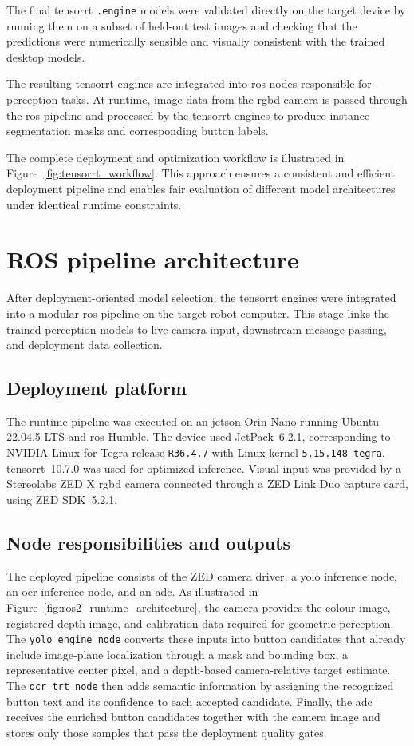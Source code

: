 The final \gls{tensorrt}
\texttt{.engine} models were validated directly on the target device by running
them on a subset of held-out test images and checking that the predictions were
numerically sensible and visually consistent with the trained desktop models.

The resulting \gls{tensorrt} engines are integrated into \gls{ros} nodes responsible for
perception tasks. At runtime, image data from the \gls{rgbd} camera is passed through
the \gls{ros} pipeline and processed by the \gls{tensorrt} engines to produce instance
segmentation masks and corresponding button labels.

The complete deployment and optimization workflow is illustrated in
Figure~\ref{fig:tensorrt_workflow}. This approach ensures a consistent and efficient
deployment pipeline and enables fair evaluation of different model architectures
under identical runtime constraints.

\section{ROS pipeline architecture}

After deployment-oriented model selection, the \gls{tensorrt} engines were integrated into
a modular \gls{ros} pipeline on the target robot computer. This stage links
the trained perception models to live camera input, downstream message passing, and
deployment data collection.

\subsection{Deployment platform}

The runtime pipeline was executed on an \gls{jetson} Orin Nano running Ubuntu
22.04.5 LTS and \gls{ros} Humble. The device used JetPack~6.2.1,
corresponding to NVIDIA Linux for Tegra release \texttt{R36.4.7} with Linux
kernel \texttt{5.15.148-tegra}. \gls{tensorrt}~10.7.0 was used for optimized
inference. Visual input was provided by a Stereolabs ZED X \gls{rgbd} camera
connected through a ZED Link Duo capture card, using ZED SDK~5.2.1.

\subsection{Node responsibilities and outputs}

The deployed pipeline consists of the ZED camera driver, a \gls{yolo} inference
node, an \gls{ocr} inference node, and an \gls{adc}. As illustrated in
Figure~\ref{fig:ros2_runtime_architecture}, the camera provides the colour image,
registered depth image, and calibration data required for geometric perception.
The \texttt{yolo\_engine\_node} converts these inputs into button candidates that
already include image-plane localization through a mask and bounding box, a
representative center pixel, and a depth-based camera-relative target estimate.
The \texttt{ocr\_trt\_node} then adds
semantic information by assigning the recognized button text and its confidence
to each accepted candidate. Finally, the \gls{adc} receives the enriched button
candidates together with the camera image and stores only those samples that pass
the deployment quality gates.

